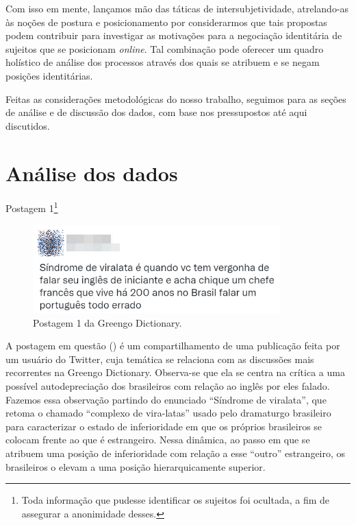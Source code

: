 \documentclass[portuguese]{textolivre}
\begin{document}
Com isso em mente, lançamos mão das táticas de intersubjetividade, atrelando-as às noções de postura e posicionamento por considerarmos que tais propostas podem contribuir para investigar as motivações para a negociação identitária de sujeitos que se posicionam \textit{online}. Tal combinação pode oferecer um quadro holístico de análise dos processos através dos quais se atribuem e se negam posições identitárias.

Feitas as considerações metodológicas do nosso trabalho, seguimos para as seções de análise e de discussão dos dados, com base nos pressupostos até aqui discutidos.

\section{Análise dos dados}\label{sec-fmt-manuscrito}
Postagem 1\footnote{Toda informação que pudesse identificar os sujeitos foi ocultada, a fim de assegurar a anonimidade desses.}

\begin{figure}[htbp]
 \centering
 \includegraphics[width=0.85\textwidth]{Fig1.png}
 \caption{Postagem 1 da Greengo Dictionary.}
 \label{fig1}
\end{figure}

A postagem em questão () é um compartilhamento de uma publicação feita por um usuário do Twitter, cuja temática se relaciona com as discussões mais recorrentes na Greengo Dictionary. Observa-se que ela se centra na crítica a uma possível autodepreciação \cite{barton_linguagem_2015} dos brasileiros com relação ao inglês por eles falado. Fazemos essa observação partindo do enunciado “Síndrome de viralata”, que retoma o chamado “complexo de vira-latas” usado pelo dramaturgo brasileiro \textcite{rodrigues_sombra_1993} para caracterizar o estado de inferioridade em que os próprios brasileiros se colocam frente ao que é estrangeiro. Nessa dinâmica, ao passo em que se atribuem uma posição de inferioridade com relação a esse “outro” estrangeiro, os brasileiros o elevam a uma posição hierarquicamente superior.												
\end{document}
